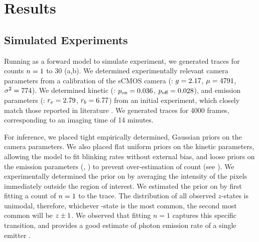 \section{Results}






\subsection{Simulated Experiments}
Running \ours as a forward model to simulate experiment, 
we generated traces for counts $n=1$ to 30 (a,b).
	We determined experimentally relevant camera parameters from a calibration of the
	sCMOS camera (\parametersc: $g=2.17$, $\mu=4791$, $\sigma^2=774$). 
	We determined kinetic (\parameterst: $p_\text{on}=0.036$, $p_\text{off}=0.028$), and emission parameters 
	(\parameterse: $r_e=2.79$, $r_b=6.77$) from an initial experiment, 
	which closely match those reported in literature \cite{stein_2021}.
	We generated traces for 4000 frames, corresponding to an imaging time of 14 minutes.

For inference, we placed tight empirically determined, Gaussian priors on 
the camera parameters.
	We also placed flat uniform priors on the kinetic parameters, allowing the model 
	to fit blinking rates without external bias,
	and loose priors on the emission parameters (\rb, \re) to prevent 
	over-estimation of count (see ). 
	We experimentally determined the prior on \rb by averaging the 
	intensity of the pixels immediately outside the region of interest.
	We estimated the prior on \re  by first fitting a count of $n=1$ to the trace.
	The distribution of all observed $z$-states is unimodal, 
	therefore, whichever \z{}-state is the most common, the second most common 
	will be $z_{} \pm 1$. 
	We observed that fitting $n=1$ captures this specific transition, and provides a good
	estimate of photon emission rate of a single emitter \re.
	
